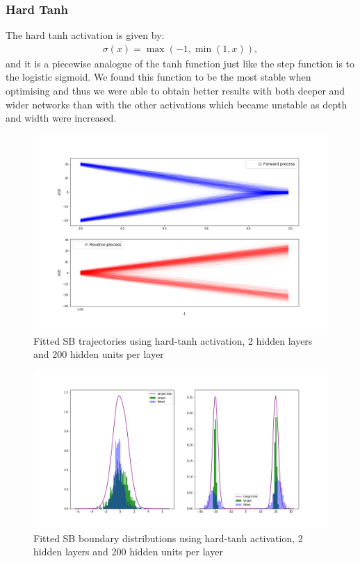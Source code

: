 \documentclass[a4paper,12pt,twoside,openright]{report}
\theoremstyle{definition}
\begin{document}
\subsubsection{Hard Tanh}

The hard tanh activation is given by:
\begin{align*}
    \sigma(x) = \max(-1, \min(1, x)),
\end{align*}
and it is a piecewise analogue of the tanh function just like the step function is to the logistic sigmoid. We found this function to be the most stable when optimising and thus we were able to obtain better results with both deeper and wider networks than with the other activations which became unstable as depth and width were increased.
\begin{figure}
    \centering
    \includegraphics[scale=0.4,trim={4cm 1cm 2.5cm 0}, clip]{images/Control/hard_tanh_200_200__succesfl_bimodal_trajectories.png}
    \caption{ Fitted SB  trajectories using hard-tanh activation, 2 hidden layers and 200 hidden units per layer}
    \label{fig:trajectoriesbimodtanhnnhard}
\end{figure}
\begin{figure}
    \centering
    \includegraphics[scale=0.4,trim={2.3cm 1cm 2.5cm 0}, clip]{images/Control/hard_tanh_200_200_succesfl_bimodal_boundaires.png}
    \caption{ Fitted SB  boundary distributions using hard-tanh activation, 2 hidden layers and 200 hidden units per layer}
    \label{fig:boundsbimodtanhnnhard}
\end{figure}
\end{document}
